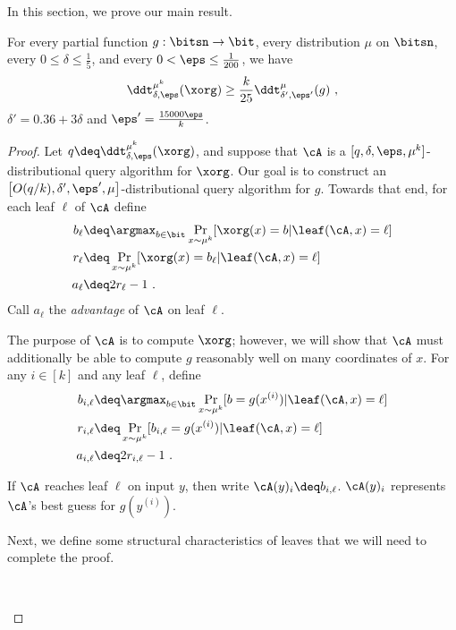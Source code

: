 \documentclass{toc}
\begin{document}
In this section, we prove our main result.

\begin{lemma}\label{lemma:main-technical}
  For every
  partial %
  function $g: \bitsn \rightarrow \bit$, every distribution
  $\mu$ on $\bitsn$, every $0 \leq \delta \leq \frac{1}{5}$, and every
  $0 < \eps \leq \frac{1}{200}$, we
  have
  $$\ddt_{\delta,\eps}^{\mu^k}(\xorg) \geq \frac{k}{25} \ddt_{\delta',\eps'}^\mu(g)\ ,$$ %
  $\delta' = 0.36+3\delta$ and $\eps' = \frac{15000\eps}{k}$.
\end{lemma}

\begin{proof}
  Let $q \deq \ddt_{\delta,\eps}^{\mu^k}(\xorg)$, and suppose that $\cA$
  is a $[q,\delta,\eps,\mu^k]$-distributional query algorithm for
  $\xorg$.  Our goal is to construct an
  $\left[O(q/k), \delta', \eps', \mu\right]$-distributional query
  algorithm for $g$.  Towards that end, for each leaf $\ell$ of
  $\cA$ define
  \begin{align*}
    b_\ell &\deq \argmax_{b \in \bit} \Pr_{x \sim \mu^k}[\xorg(x) = b | \leaf(\cA, x) = \ell] \\
    r_\ell &\deq \Pr_{x \sim \mu^k}[\xorg(x) = b_\ell | \leaf(\cA,x) = \ell] \\
    a_\ell &\deq 2r_\ell - 1\ .
  \end{align*}
  Call $a_\ell$ the \emph{advantage} of $\cA$ on leaf $\ell$.

  The purpose of $\cA$ is to compute $\xorg$; however, %
  we will %
  show that
  $\cA$ must additionally be able to compute $g$ reasonably
  well on many coordinates of $x$.  For any $i \in [k]$ and any leaf $\ell$, define
  \begin{align*}
    b_{i,\ell} &\deq \argmax_{b \in \bit} \Pr_{x \sim \mu^k}[b = g(x^{(i)}) | \leaf(\cA,x) = \ell] \\
    r_{i,\ell} &\deq \Pr_{x\sim \mu^k}[b_{i,\ell} = g(x^{(i)}) | \leaf(\cA,x) = \ell] \\
    a_{i,\ell} &\deq 2r_{i,\ell} - 1\ .
  \end{align*}

  If $\cA$ reaches leaf $\ell$ on input $y$, then write $\cA(y)_i \deq
  b_{i,\ell}$.  $\cA(y)_i$ represents $\cA$'s best guess for $g(y^{(i)})$.

  Next, we define some structural characteristics of leaves that %
  we will %
  need to complete the proof.

  \begin{definition}
    \mbox{ }
    

\end{definition}
\end{proof}
\end{document}
